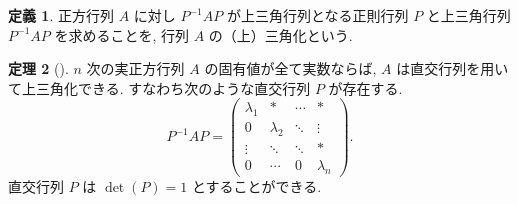\documentclass[dvipdfmx,a4paper,11pt]{article} %
\theoremstyle{definition}
\newtheorem{thm}{定理}[section]
\newtheorem{defn}[thm]{定義}
\begin{document}
\begin{defn}
正方行列 \(A\) に対し \(P^{-1}AP\) が上三角行列となる正則行列 \(P\) と上三角行列 \(P^{-1}AP\) を求めることを, 行列 \(A\) の（上）三角化という.
\end{defn}

\begin{thm}
[{\cite[定理6.3.2]{M}}]
\(n\) 次の実正方行列 \(A\) の固有値が全て実数ならば, \(A\) は直交行列を用いて上三角化できる. すなわち次のような直交行列 \(P\) が存在する.
\[
P^{-1}AP=
\begin{pmatrix}
\lambda_1&*&\cdots&*\\
0&\lambda_2&\ddots&\vdots\\
\vdots&\ddots&\ddots&*\\
0&\cdots&0&\lambda_n
\end{pmatrix}.
\]
直交行列 \(P\) は
\(
\det(P)=1
\)
とすることができる.
\end{thm}
\end{document}
